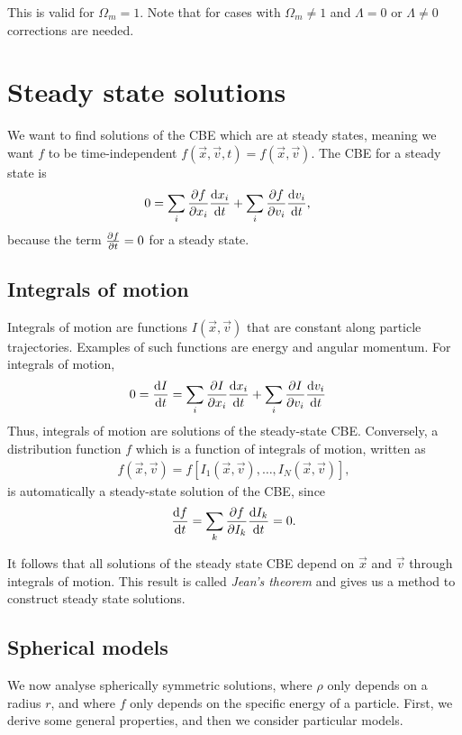 This is valid for $\Omega_m = 1$. Note that for cases with $\Omega_m \neq 1$ and $\Lambda = 0$ or $\Lambda \neq 0$ corrections are needed.  

\section{Steady state solutions}

We want to find solutions of the CBE which are at steady states, meaning we want $f$ to be time-independent $f(\vec{x}, \vec{v}, t) = f(\vec{x}, \vec{v}) $. The CBE for a steady state is
\begin{align*}
	0
	&= \sum_{i} \pdv{f}{x_i} \dv{x_i}{t}
	+ \sum_{i} \pdv{f}{v_i} \dv{v_i}{t},
\end{align*}
because the term $\pdv{f}{t} = 0$ for a steady state.

\subsection{Integrals of motion}
Integrals of motion are functions $I(\vec{x}, \vec{v})$ that are constant along particle trajectories.
Examples of such functions are energy and angular momentum.
For integrals of motion,
\begin{align*}
	0 &= \dv{I}{t}
	= \sum_{i} \pdv{I}{x_i} \dv{x_i}{t} + \sum_{i} \pdv{I}{v_i} \dv{v_i}{t}
\end{align*}
Thus, integrals of motion are solutions of the steady-state CBE.
Conversely, a distribution function $f$ which is a function of integrals of motion, written as
\begin{align*}
	f(\vec{x}, \vec{v}) = f[I_1(\vec{x}, \vec{v}), \dots, I_N(\vec{x}, \vec{v})],
\end{align*}
is automatically a steady-state solution of the CBE, since
\begin{align*}
	\dv{f}{t}
	= \sum_{k} \pdv{f}{I_k} \dv{I_k}{t} = 0.
\end{align*}

It follows that all solutions of the steady state CBE depend on $\vec{x}$ and $\vec{v}$ through integrals of motion. This result is called \emph{Jean's theorem} and gives us a method to construct steady state solutions. 

\subsection{Spherical models}
\label{ssec:spherical-models}
We now analyse spherically symmetric solutions, where $\rho$ only depends on a radius $r$, and where $f$ only depends on the specific energy of a particle.
First, we derive some general properties, and then we consider particular models.

